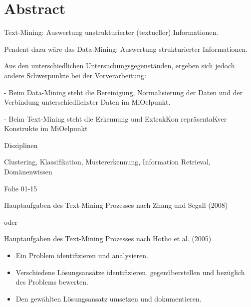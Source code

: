 \chapter*{Abstract}
\thispagestyle{empty}
Text-Mining: Auswertung unstrukturierter (textueller) Informationen.

Pendent dazu wäre das Data-Mining: Auswertung strukturierter Informationen.

Aus den unterschiedlichen Untersuchungsgegenständen, ergeben sich jedoch andere Schwerpunkte bei der Vorverarbeitung:

- Beim Data-Mining steht die Bereinigung, Normalisierung der Daten und der Verbindung unterschiedlichster Daten im MiOelpunkt.

- Beim Text-Mining steht die Erkennung und ExtrakKon repräsentaKver Konstrukte im MiOelpunkt

Disziplinen

Clustering, Klassifikation, Mustererkennung, Information Retrieval, Domänenwissen

Folie 01-15

Hauptaufgaben des Text-Mining Prozesses nach Zhang und Segall (2008)

oder 

Hauptaufgaben des Text-Mining Prozesses nach Hotho et al. (2005)

\begin{itemize}
    \item Ein Problem identifizieren und analysieren.
    \item Verschiedene Lösungsansätze identifizieren, gegenüberstellen und bezüglich des Problems bewerten.
    \item Den gewählten Lösungsansatz umsetzen und dokumentieren.
\end{itemize}

